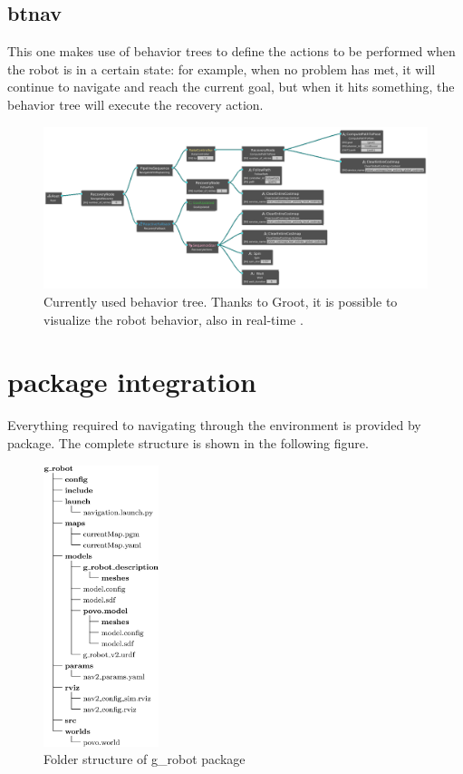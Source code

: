 \subsection{\acrfull{btnav}}

This one makes use of behavior trees to define the actions to be performed when the robot is in a certain state: for example, when no problem has met, it will continue to navigate and reach the current goal, but when it hits something, the behavior tree will execute the recovery action.

\begin{figure}[h]
    \centering
    \includegraphics[width=\textwidth]{images/bt-alpha.png}
    \caption{Currently used behavior tree. Thanks to Groot, it is possible to visualize the robot behavior, also in real-time \cite{groot}.}
\end{figure}

\section{ package integration}

Everything required to navigating through the environment is provided by  package. The complete structure is shown in the following figure.

\begin{figure}
  \includegraphics[width=0.3\textwidth]{images/g-robot}
  \caption{Folder structure of g\_robot package}
\end{figure}

